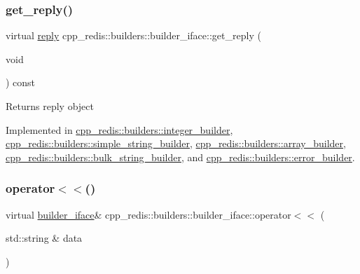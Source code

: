 \subsubsection{\texorpdfstring{get\+\_\+reply()}{get\_reply()}}
{\footnotesize\ttfamily virtual \mbox{\hyperlink{classcpp__redis_1_1reply}{reply}} cpp\+\_\+redis\+::builders\+::builder\+\_\+iface\+::get\+\_\+reply (\begin{DoxyParamCaption}\item[{void}]{ }\end{DoxyParamCaption}) const\hspace{0.3cm}{\ttfamily [pure virtual]}}

\begin{DoxyReturn}{Returns}
reply object 
\end{DoxyReturn}


Implemented in \mbox{\hyperlink{classcpp__redis_1_1builders_1_1integer__builder_a25221763ba6f8b740458c673945208e0}{cpp\+\_\+redis\+::builders\+::integer\+\_\+builder}}, \mbox{\hyperlink{classcpp__redis_1_1builders_1_1simple__string__builder_a24ad0968d7d02172a65cf8982c540d51}{cpp\+\_\+redis\+::builders\+::simple\+\_\+string\+\_\+builder}}, \mbox{\hyperlink{classcpp__redis_1_1builders_1_1array__builder_ac5c805ad87b357a9578c5a0d479109b3}{cpp\+\_\+redis\+::builders\+::array\+\_\+builder}}, \mbox{\hyperlink{classcpp__redis_1_1builders_1_1bulk__string__builder_a56d6d3089107a1bccd63f6a5267c16cb}{cpp\+\_\+redis\+::builders\+::bulk\+\_\+string\+\_\+builder}}, and \mbox{\hyperlink{classcpp__redis_1_1builders_1_1error__builder_ae2b68b7daad4d71b6780e47bdcc1e32b}{cpp\+\_\+redis\+::builders\+::error\+\_\+builder}}.

\mbox{\label{classcpp__redis_1_1builders_1_1builder__iface_a9892bbc9c887c31c2742dad4476e2fa6}} 
\subsubsection{\texorpdfstring{operator$<$$<$()}{operator<<()}}
{\footnotesize\ttfamily virtual \mbox{\hyperlink{classcpp__redis_1_1builders_1_1builder__iface}{builder\+\_\+iface}}\& cpp\+\_\+redis\+::builders\+::builder\+\_\+iface\+::operator$<$$<$ (\begin{DoxyParamCaption}\item[{std\+::string \&}]{data }\end{DoxyParamCaption})\hspace{0.3cm}{\ttfamily [pure virtual]}}

